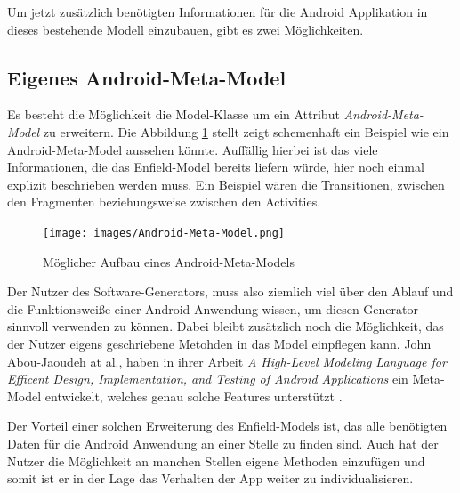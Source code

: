 Um jetzt zusätzlich benötigten Informationen für die Android Applikation in dieses bestehende Modell einzubauen, gibt es zwei Möglichkeiten.

\subsection{Eigenes Android-Meta-Model}

Es besteht die Möglichkeit die Model-Klasse um ein Attribut \textit{Android-Meta-Model} zu erweitern.
Die Abbildung \ref{fig:android-model} stellt zeigt schemenhaft ein Beispiel wie ein Android-Meta-Model aussehen könnte. Auffällig hierbei ist das viele Informationen, die das Enfield-Model bereits liefern würde, hier noch einmal explizit beschrieben werden muss. Ein Beispiel wären die Transitionen, zwischen den Fragmenten beziehungsweise zwischen den Activities. 


\begin{figure}[H]
	\begin{center}
		\texttt{[image: images/Android-Meta-Model.png]}
		\caption{Möglicher Aufbau eines Android-Meta-Models}
		\label{fig:android-model}
	\end{center}
\end{figure}

Der Nutzer des Software-Generators, muss also ziemlich viel über den Ablauf und die Funktionsweiße einer Android-Anwendung wissen, um diesen Generator sinnvoll verwenden zu können.
Dabei bleibt zusätzlich noch die Möglichkeit, das der Nutzer eigens geschriebene Metohden in das Model einpflegen kann. John Abou-Jaoudeh at al., haben in ihrer Arbeit \textit{A High-Level Modeling Language for Efficent Design, Implementation, and Testing of Android Applications} ein Meta-Model entwickelt, welches genau solche Features unterstützt \cite{abou2015high}.

Der Vorteil einer solchen Erweiterung des Enfield-Models ist, das alle benötigten Daten für die Android Anwendung an einer Stelle zu finden sind. Auch hat der Nutzer die Möglichkeit an manchen Stellen eigene Methoden einzufügen und somit ist er in der Lage das Verhalten der App weiter zu individualisieren.


